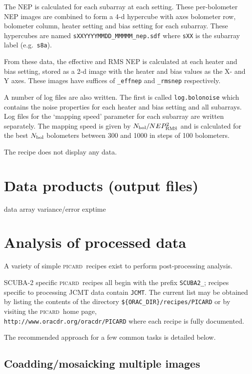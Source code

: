 \documentclass[twoside,11pt]{article}
\newcommand{\htmladdnormallink}[2]{#1}
\newcommand{\xlabel}[1]{}
\renewcommand{\_}{\texttt{\symbol{95}}}
\newcommand{\picard}{\textsc{picard}}
\begin{document}
The NEP is calculated for each subarray at each setting. These
per-bolometer NEP images are combined to form a 4-d hypercube with
axes bolometer row, bolometer column, heater setting and bias setting
for each subarray. These hypercubes are named
\verb+sXXYYYYMMDD_MMMMM_nep.sdf+ where \verb+sXX+ is the subarray
label (e.g.\ \verb+s8a+).

From these data, the effective and RMS NEP is calculated at each
heater and bias setting, stored as a 2-d image with the heater and
bias values as the X- and Y axes. These images have suffices of
\verb+_effnep+ and \verb+_rmsnep+ respectively.

A number of log files are also written. The first is called
\verb+log.bolonoise+ which contains the noise properties for each
heater and bias setting and all subarrays. Log files for the `mapping
speed' parameter for each subarray are written separately. The mapping
speed is given by $N_{\rm bol} / NEP_{\rm RMS}^2$ and is calculated
for the best $N_{\rm bol}$ bolometers between 300 and 1000 in steps of
100 bolometers.

The recipe does not display any data.

\section{\xlabel{dataproducts}Data products (output files)\label{se:dataprod}}

data array
variance/error
exp\_time

\section{\xlabel{picard}Analysis of processed data\label{picard}}

A variety of simple \picard\ recipes exist to perform post-processing
analysis.

SCUBA-2 specific \picard\ recipes all begin with the prefix
\verb+SCUBA2_+; recipes specific to processing JCMT data contain
\verb+JCMT+. The current list may be obtained by listing the contents
of the directory \verb+${ORAC_DIR}/recipes/PICARD+ or by visiting the
\picard\ home
page,\\ \htmladdnormallink{\texttt{http://www.oracdr.org/oracdr/PICARD}}{http://www.oracdr.org/oracdr/PICARD}
where each recipe is fully documented.

The recommended approach for a few common tasks is detailed below.

\subsection{Coadding/mosaicking multiple images}
\end{document}
